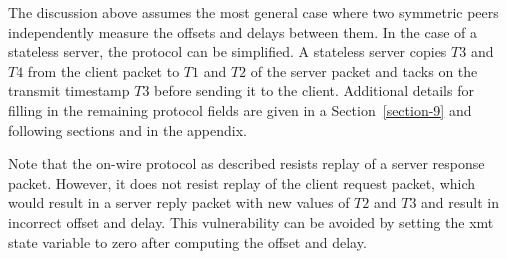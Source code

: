 The discussion above assumes the most general case where two
symmetric peers independently measure the offsets and delays between
them. In the case of a stateless server, the protocol can be
simplified. A stateless server copies $ T3 $ and $ T4 $ from the client
packet to $ T1 $ and $ T2 $ of the server packet and tacks on the transmit
timestamp $ T3 $ before sending it to the client. Additional details for
filling in the remaining protocol fields are given in a Section~\ref{section-9} and
following sections and in the appendix.

Note that the on-wire protocol as described resists replay of a
server response packet. However, it does not resist replay of the
client request packet, which would result in a server reply packet
with new values of $ T2 $ and $ T3 $ and result in incorrect offset and
delay. This vulnerability can be avoided by setting the xmt state
variable to zero after computing the offset and delay.
